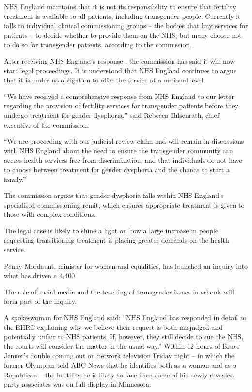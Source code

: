 NHS England maintains that it is not its responsibility to ensure that fertility treatment is available to all patients, including transgender people. Currently it falls to individual clinical commissioning groups – the bodies that buy services for patients – to decide whether to provide them on the NHS, but many choose not to do so for transgender patients, according to the commission.

After receiving NHS England’s response , the commission has said it will now start legal proceedings. It is understood that NHS England continues to argue that it is under no obligation to offer the service at a national level.

“We have received a comprehensive response from NHS England to our letter regarding the provision of fertility services for transgender patients before they undergo treatment for gender dysphoria,” said Rebecca Hilsenrath, chief executive of the commission.

“We are proceeding with our judicial review claim and will remain in discussions with NHS England about the need to ensure the transgender community can access health services free from discrimination, and that individuals do not have to choose between treatment for gender dysphoria and the chance to start a family.”

The commission argues that gender dysphoria falls within NHS England’s specialised commissioning remit, which ensures appropriate treatment is given to those with complex conditions.

The legal case is likely to shine a light on how a large increase in people requesting transitioning treatment is placing greater demands on the health service.

Penny Mordaunt, minister for women and equalities, has launched an inquiry into what has driven a 4,400%

The role of social media and the teaching of transgender issues in schools will form part of the inquiry.

A spokeswoman for NHS England said: “NHS England has responded in detail to the EHRC explaining why we believe their request is both misjudged and potentially unfair to NHS patients. If, however, they still decide to sue the NHS, the courts will consider the matter in the usual way.”
Within 12 hours of Bruce Jenner’s double coming out on network television Friday night – in which the former Olympian told ABC News that he identifies both as a woman and as a Republican – the hostility he is likely to face from some of his newly revealed party associates was on full display in Minnesota.

